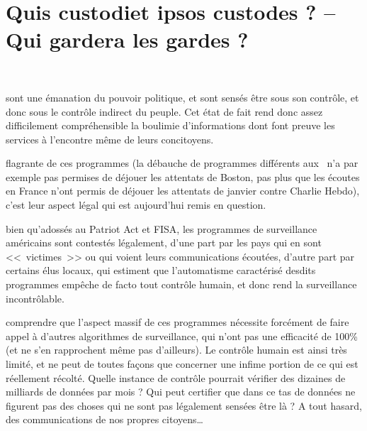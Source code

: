 
\chapter{Quis custodiet ipsos custodes ? -- Qui gardera les gardes ?}
\label{impact}

~\vfill
\begin{doublespace}
\noindent\fontsize{18}{22}\selectfont\itshape
\nohyphenation
{}
\end{doublespace}
\vfill
\vfill

 sont une émanation du pouvoir
politique, et sont sensés être sous son contrôle, et donc sous le contrôle
indirect du peuple. Cet état de fait rend donc assez difficilement
compréhensible la boulimie d'informations dont font preuve les services à
l'encontre même de leurs  concitoyens.

 flagrante de ces programmes\autocite{surve}
(la débauche de programmes différents aux \EUA~n'a par exemple pas permises de
déjouer les attentats de Boston, pas plus que les écoutes en France n'ont permis de déjouer
les attentats de janvier contre Charlie Hebdo), c'est leur aspect légal qui est
aujourd'hui remis en question.

 bien qu'adossés au Patriot Act et FISA, les programmes
de surveillance américains sont contestés légalement, d'une part par les pays qui
en sont <<~victimes~>> ou qui voient leurs communications écoutées, d'autre part
par certains élus locaux, qui estiment que l'automatisme caractérisé desdits
programmes empêche de facto tout contrôle humain, et donc rend la surveillance
incontrôlable.

 comprendre que l'aspect massif de ces programmes
nécessite forcément de faire appel à d'autres algorithmes de surveillance, qui
n'ont pas une efficacité de 100\% (et ne s'en rapprochent même pas d'ailleurs).
Le contrôle humain est ainsi très limité, et ne peut de toutes façons que
concerner une infime portion de ce qui est réellement récolté. Quelle instance
de contrôle pourrait vérifier des dizaines de milliards de données par mois ?
Qui peut certifier que dans ce tas de données ne figurent pas des choses qui ne
sont pas légalement sensées être là ? A tout hasard, des communications de nos propres
citoyens\ldots 

